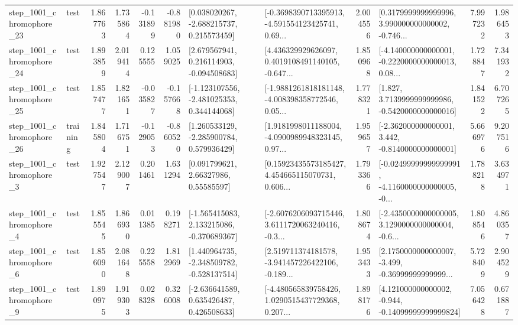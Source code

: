 \begin{tabular}{llrrrrllrlrr}
 step\_1001\_chromophore\_23 &      test &      1.867763 &    1.735864 &     -0.131899 & -0.881980 &    [0.038020267, -2.688215737, 0.215573459] &  [-0.3698390713395913, -4.591554123425741, 0.69... &       2.004556 &  [0.3179999999999996, 3.990000000000002, -0.746... &            7.997232 &          1.986453 \\
 step\_1001\_chromophore\_24 &      test &      1.893859 &    2.019414 &      0.125555 &  1.059025 &    [2.679567941, 0.216114903, -0.094508683] &  [4.436329929626097, 0.4019108491140105, -0.647... &       1.850968 &  [-4.140000000000001, -0.2220000000000013, 0.08... &            1.728847 &          7.341932 \\
 step\_1001\_chromophore\_25 &      test &      1.857477 &    1.821651 &     -0.035827 & -0.157668 &   [-1.123107556, -2.481025353, 0.344144068] &  [-1.9881261818181148, -4.008398358772546, 0.05... &       1.778321 &   [1.827, 3.7139999999999986, -0.5420000000000016] &            1.841522 &          6.707265 \\
 step\_1001\_chromophore\_26 &  training &      1.845804 &    1.716751 &     -0.129053 & -0.860520 &    [1.260533129, -2.285900784, 0.579936429] &  [1.9181998011188004, -4.0900989948323145, 0.97... &       1.959657 &   [-2.362000000000001, 3.442, -0.8140000000000001] &            5.666976 &          9.207516 \\
  step\_1001\_chromophore\_3 &      test &      1.927547 &    2.129007 &      0.201461 &  1.631294 &       [0.091799621, 2.66327986, 0.55585597] &  [0.15923435573185427, 4.454665115070731, 0.606... &       1.793366 &  [-0.02499999999999991, -4.1160000000000005, -0... &            1.788218 &          3.634971 \\
  step\_1001\_chromophore\_4 &      test &      1.855545 &    1.866930 &      0.011385 &  0.198271 &   [-1.565415083, 2.133215086, -0.370689367] &  [-2.6076206093715446, 3.6111720063240416, -0.3... &       1.808674 &  [-2.4350000000000005, 3.1290000000000004, -0.6... &            1.808546 &          4.860357 \\
  step\_1001\_chromophore\_6 &      test &      1.856090 &    2.081648 &      0.225558 &  1.812969 &   [1.440964735, -2.348509782, -0.528137514] &  [2.519711374181578, -3.941457226422106, -0.189... &       1.953433 &  [2.1750000000000007, -3.499, -0.36999999999999... &            5.728409 &          2.904529 \\
  step\_1001\_chromophore\_9 &      test &      1.890975 &    1.919303 &      0.028328 &  0.326008 &    [-2.636641589, 0.635426487, 0.426508633] &  [-4.480565839758426, 1.0290515437729368, 0.207... &       1.898176 &  [4.121000000000002, -0.944, -0.14099999999999824] &            7.056428 &          0.671887 \\

\end{tabular}
